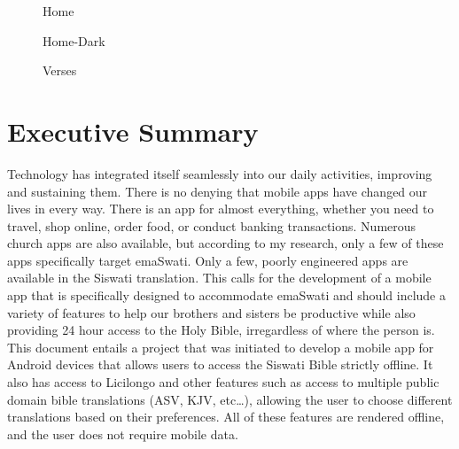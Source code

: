\documentclass[11pt]{report}
\begin{document}
    \begin{center}
        \begin{figure}[h!]
            \begin{minipage}[h!]{0.30\textwidth}
                \centering
                \caption{Home}
            \end{minipage}
            \hfill
            \begin{minipage}[h!]{0.3\textwidth}
                \centering
                \caption{Home-Dark}
            \end{minipage}
            \hfill
            \begin{minipage}[h!]{0.3\textwidth}
                \centering
                \caption{Verses}
            \end{minipage}
        \end{figure}
    \end{center}

    \section*{Executive Summary}\label{sec:executive-summary}
    Technology has integrated itself seamlessly into our daily activities, improving and sustaining them.
    There is no denying that mobile apps have changed our lives in every way.
    There is an app for almost everything, whether you need to travel, shop online, order food, or conduct banking
    transactions.
    Numerous church apps are also available, but according to my research, only a few of these apps specifically
    target emaSwati.
    Only a few, poorly engineered apps are available in the Siswati translation.
    This calls for the development of a mobile app that is specifically designed to accommodate emaSwati and
    should include a variety of features to help our brothers and sisters be productive while also providing 24 hour
    access to the Holy Bible, irregardless of where the person is.\\

    This document entails a project that was initiated to develop a mobile app for Android devices that allows users
    to access the Siswati Bible strictly offline.
    It also has access to Licilongo and other features such as access to multiple public domain bible translations
    (ASV, KJV, etc\ldots), allowing the user to choose different translations based on their preferences.
    All of these features are rendered offline, and the user does not require mobile data.\\
\end{document}
